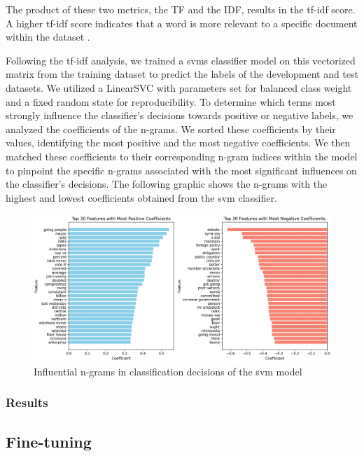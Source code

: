 The product of these two metrics, the TF and the IDF, results in the \gls{tf-idf} score. A higher \gls{tf-idf} score indicates that a word is more relevant to a specific document within the dataset \cite{TF-IDF}.

Following the \gls{tf-idf} analysis, we trained a \glspl{svm} classifier model on this vectorized matrix from the training dataset to predict the labels of the development and test datasets. We utilized a LinearSVC with parameters set for balanced class weight and a fixed random state for reproducibility. To determine which terms most strongly influence the classifier's decisions towards positive or negative labels, we analyzed the coefficients of the n-grams. We sorted these coefficients by their values, identifying the most positive and the most negative coefficients. We then matched these coefficients to their corresponding n-gram indices within the model to pinpoint the specific n-grams associated with the most significant influences on the classifier's decisions. The following graphic shows the n-grams with the highest and lowest coefficients obtained from the \gls{svm} classifier.

\begin{figure}[h]
    \centering
    \includegraphics[width=1\textwidth]{assets/svm_coef.jpg}
    \caption{Influential n-grams in classification decisions of the svm model}
    \label{fig:my_label}
\end{figure}


\subsubsection{Results}

\newpage
\subsection{Fine-tuning} \label{fine-tuning}

